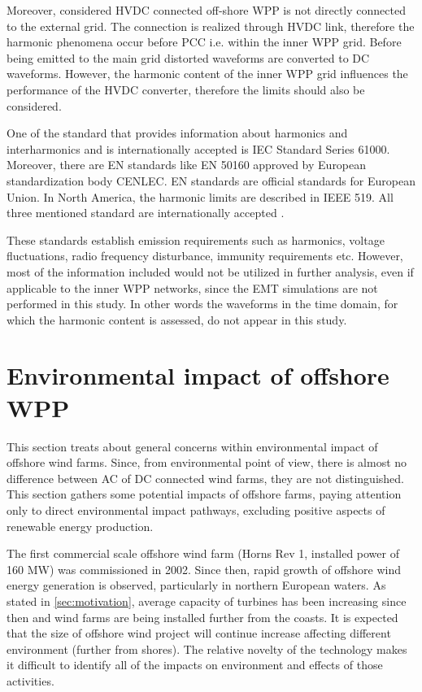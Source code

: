 \documentclass[12pt]{report} %
\begin{document}
Moreover, considered HVDC connected off-shore WPP is not directly connected to the external grid. The connection is realized through HVDC link, therefore the harmonic phenomena occur before PCC i.e. within the inner WPP grid. Before being emitted to the main grid distorted waveforms are converted to DC waveforms. However, the harmonic content of the inner WPP grid influences the performance of the HVDC converter, therefore the limits should also be considered.

One of the standard that provides information about harmonics and interharmonics and is internationally accepted is \cite{iec61000} IEC Standard Series 61000. Moreover, there are EN standards like \cite{en50160} EN 50160 approved by European standardization body CENLEC. EN standards are official standards for European Union. In North America, the harmonic limits are described in \cite{ieee519} IEEE 519. All three mentioned standard are internationally accepted \cite{das}.

These standards establish emission requirements such as harmonics, voltage fluctuations, radio frequency disturbance, immunity requirements etc. However, most of the information included would not be utilized in further analysis, even if applicable to the inner WPP networks, since the EMT simulations are not performed in this study. In other words the waveforms in the time domain, for which the harmonic content is assessed, do not appear in this study.

\chapter{Environmental impact of offshore WPP}
This section treats about general concerns within environmental impact of offshore wind farms. Since, from environmental point of view, there is almost no difference between AC of DC connected wind farms, they are not distinguished. This section gathers some potential impacts of offshore farms, paying attention only to direct environmental impact pathways, excluding positive aspects of renewable energy production.

The first commercial scale offshore wind farm (Horns Rev 1, installed power of 160 MW) was commissioned in 2002. Since then, rapid growth of offshore wind energy generation is observed, particularly in northern European waters. As stated in \ref{sec:motivation}, average capacity of turbines has been increasing since then and wind farms are being installed further from the coasts. It is expected that the size of offshore wind project will continue increase \cite{offshorestat2014} affecting different environment (further from shores). The relative novelty of the technology makes it difficult to identify all of the impacts on environment and effects of those activities.
\end{document}
